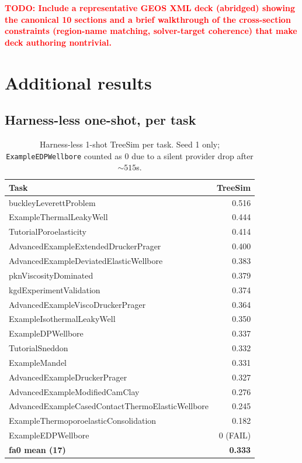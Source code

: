 \documentclass{article}
\newcommand{\todo}[1]{\textcolor{red}{\textbf{TODO: #1}}}
\begin{document}
\todo{Include a representative GEOS XML deck (abridged) showing the canonical 10 sections and a brief walkthrough of the cross-section constraints (region-name matching, solver-target coherence) that make deck authoring nontrivial.}

\section{Additional results}
\label{app:results}

\subsection{Harness-less one-shot, per task}
\begin{table}[h]
  \caption{Harness-less 1-shot TreeSim per task. Seed 1 only; \texttt{ExampleEDPWellbore} counted as 0 due to a silent provider drop after $\sim 515$s.}
  \label{tab:harnessless}
  \centering
  \small
  \begin{tabular}{lr}
    \toprule
    \textbf{Task} & \textbf{TreeSim} \\
    \midrule
    buckleyLeverettProblem                              & 0.516 \\
    ExampleThermalLeakyWell                             & 0.444 \\
    TutorialPoroelasticity                              & 0.414 \\
    AdvancedExampleExtendedDruckerPrager                & 0.400 \\
    AdvancedExampleDeviatedElasticWellbore              & 0.383 \\
    pknViscosityDominated                               & 0.379 \\
    kgdExperimentValidation                             & 0.374 \\
    AdvancedExampleViscoDruckerPrager                   & 0.364 \\
    ExampleIsothermalLeakyWell                          & 0.350 \\
    ExampleDPWellbore                                   & 0.337 \\
    TutorialSneddon                                     & 0.332 \\
    ExampleMandel                                       & 0.331 \\
    AdvancedExampleDruckerPrager                        & 0.327 \\
    AdvancedExampleModifiedCamClay                      & 0.276 \\
    AdvancedExampleCasedContactThermoElasticWellbore    & 0.245 \\
    ExampleThermoporoelasticConsolidation               & 0.182 \\
    ExampleEDPWellbore                                  & 0 (FAIL) \\
    \midrule
    \textbf{fa0 mean (17)}                              & \textbf{0.333} \\
    \bottomrule
  \end{tabular}
\end{table}
\end{document}
